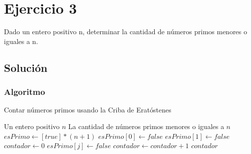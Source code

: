 \section{Ejercicio 3}
Dado un entero positivo n, determinar la cantidad de números primos menores o iguales a n.

\subsection*{Solución}
\subsubsection*{Algoritmo}
\begin{algorithm}[H]
\caption{Contar números primos usando la Criba de Eratóstenes}
\begin{algorithmic}[1]
\REQUIRE Un entero positivo $n$
\ENSURE La cantidad de números primos menores o iguales a $n$
\STATE $esPrimo \gets [true] * (n+1)$ 
\STATE $esPrimo[0] \gets false$
\STATE $esPrimo[1] \gets false$
\STATE $contador \gets 0$
            \STATE $esPrimo[j] \gets false$
        \ENDFOR
    \ENDIF
\ENDFOR
{}
        \STATE $contador \gets contador + 1$
    \ENDIF
\ENDFOR
\RETURN $contador$
\end{algorithmic}
\end{algorithm}

